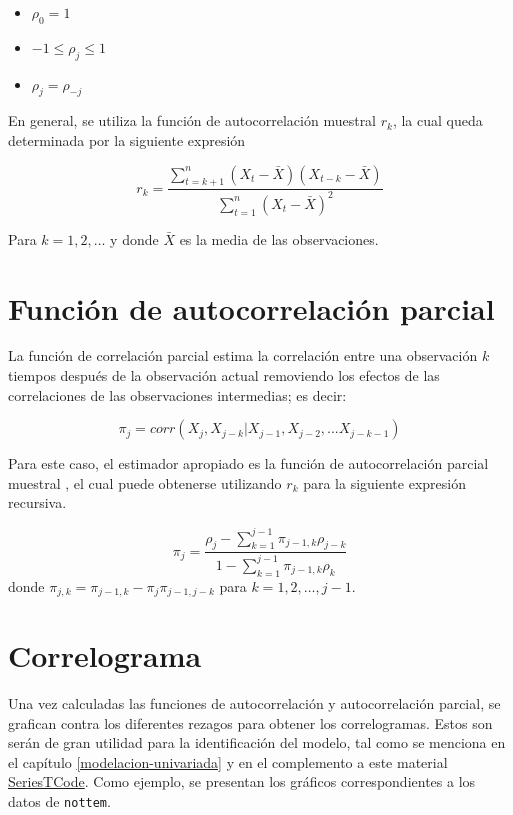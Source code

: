 \documentclass[
  a4paper,
  oneside,
  openany]{book}
\providecommand{\tightlist}{%
  \setlength{\itemsep}{0pt}\setlength{\parskip}{0pt}}
\begin{document}
\begin{itemize}
\tightlist
\item
  \(\rho_0=1\)
\item
  \(-1\leq\rho_j\leq 1\)
\item
  \(\rho_j=\rho_{-j}\)
\end{itemize}

En general, se utiliza la función de autocorrelación muestral \(r_k\), la cual queda determinada por la siguiente expresión

\[
r_k=\frac{\sum\limits_{t = k+1}^n (X_t-\bar{X})(X_{t-k}-\bar{X})}{\sum\limits_{t = 1}^n(X_t-\bar{X})^2}
\]

Para \(k = 1, 2, \dots\) y donde \(\bar{X}\) es la media de las observaciones.

\hypertarget{funciuxf3n-de-autocorrelaciuxf3n-parcial}{%
\section{Función de autocorrelación parcial}\label{funciuxf3n-de-autocorrelaciuxf3n-parcial}}

La función de correlación parcial estima la correlación entre una observación \(k\) tiempos después de la observación actual removiendo los efectos de las correlaciones de las observaciones intermedias; es decir:

\[
\pi_j=corr(X_j,X_{j-k}|X_{j-1},X_{j-2},...X_{j-k-1})
\]

Para este caso, el estimador apropiado es la función de autocorrelación parcial muestral \citet{cryer2008time}, el cual puede obtenerse utilizando \(r_k\) para la siguiente expresión recursiva.

\[
\pi_j=\frac{\rho_j-\sum\limits_{k = 1}^{j-1}\pi_{j-1, k}\rho_{j-k}}{1-\sum\limits_{k = 1}^{j-1}\pi_{j-1, k}\rho_k}
\]
donde \(\pi_{j, k} = \pi_{j-1, k}-\pi_{j}\pi_{j-1, j-k}\) para \(k = 1,2, \dots, j-1\).

\hypertarget{correlograma}{%
\section{Correlograma}\label{correlograma}}

Una vez calculadas las funciones de autocorrelación y autocorrelación parcial, se grafican contra los diferentes rezagos para obtener los correlogramas. Estos son serán de gran utilidad para la identificación del modelo, tal como se menciona en el capítulo \ref{modelacion-univariada} y en el complemento a este material \href{https://rpubs.com/CarlosFVG/SeriesTCodeCFVG}{SeriesTCode}. Como ejemplo, se presentan los gráficos correspondientes a los datos de \texttt{nottem}.
\end{document}
